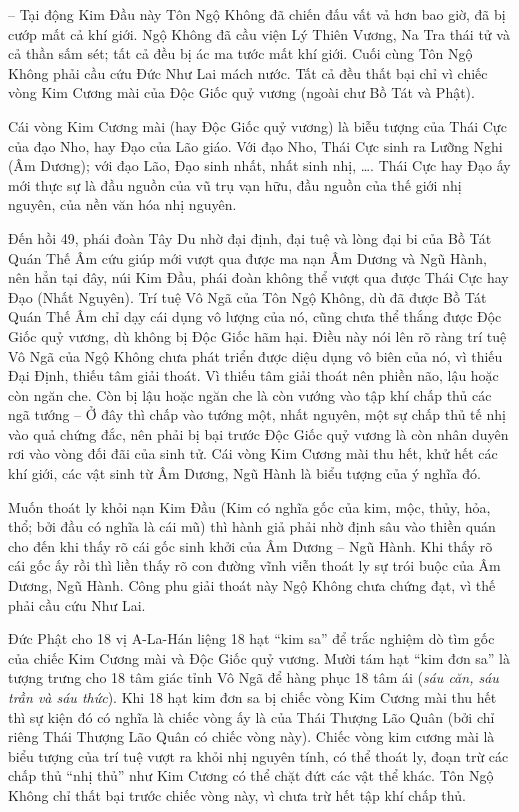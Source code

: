 -- Tại động Kim Đầu này Tôn Ngộ Không đã chiến đấu vất vả hơn bao giờ, đã bị cướp mất cả khí giới. Ngộ Không đã cầu viện Lý Thiên Vương, Na Tra thái tử và cả thần sấm sét; tất cả đều bị ác ma tước mất khí giới. Cuối cùng Tôn Ngộ Không phải cầu cứu Đức Như Lai mách nước. Tất cả đều thất bại chỉ vì chiếc vòng Kim Cương mài của Độc Giốc quỷ vương (ngoài chư Bồ Tát và Phật).

Cái vòng Kim Cương mài (hay Độc Giốc quỷ vương) là biễu tượng của Thái Cực của đạo Nho, hay Đạo của Lão giáo. Với đạo Nho, Thái Cực sinh ra Lưỡng Nghi (Âm Dương); với đạo Lão, Đạo sinh nhất, nhất sinh nhị, \ldots. Thái Cực hay Đạo ấy mới thực sự là đầu nguồn của vũ trụ vạn hữu, đầu nguồn của thế giới nhị nguyên, của nền văn hóa nhị nguyên.

Đến hồi 49, phái đoàn Tây Du nhờ đại định, đại tuệ và lòng đại bi của Bồ Tát Quán Thế Âm cứu giúp mới vượt qua được ma nạn Âm Dương và Ngũ Hành, nên hẳn tại đây, núi Kim Đầu, phái đoàn không thể vượt qua được Thái Cực hay Đạo (Nhất Nguyên). Trí tuệ Vô Ngã của Tôn Ngộ Không, dù đã được Bồ Tát Quán Thế Âm chỉ dạy cái dụng vô lượng của nó, cũng chưa thể thắng được Độc Giốc quỷ vương, dù không bị Độc Giốc hãm hại. Điều này nói lên rõ ràng trí tuệ Vô Ngã của Ngộ Không chưa phát triển được diệu dụng vô biên của nó, vì thiếu Đại Định, thiếu tâm giải thoát. Vì thiếu tâm giải thoát nên phiền não, lậu hoặc còn ngăn che. Còn bị lậu hoặc ngăn che là còn vướng vào tập khí chấp thủ các ngã tướng -- Ở đây thì chấp vào tướng một, nhất nguyên, một sự chấp thủ tế nhị vào quả chứng đắc, nên phải bị bại trước Độc Giốc quỷ vương là còn nhân duyên rơi vào vòng đối đãi của sinh tử. Cái vòng Kim Cương mài thu hết, khử hết các khí giới, các vật sinh từ Âm Dương, Ngũ Hành là biểu tượng của ý nghĩa đó.

Muốn thoát ly khỏi nạn Kim Đầu (Kim có nghĩa gốc của kim, mộc, thủy, hỏa, thổ; bởi đầu có nghĩa là cái mũ) thì hành giả phải nhờ định sâu vào thiền quán cho đến khi thấy rõ cái gốc sinh khởi của Âm Dương -- Ngũ Hành. Khi thấy rõ cái gốc ấy rồi thì liền thấy rõ con đường vĩnh viễn thoát ly sự trói buộc của Âm Dương, Ngũ Hành. Công phu giải thoát này Ngộ Không chưa chứng đạt, vì thế phải cầu cứu Như Lai.

Đức Phật cho 18 vị A-La-Hán liệng 18 hạt ``kim sa'' để trắc nghiệm dò tìm gốc của chiếc Kim Cương mài và Độc Giốc quỷ vương. Mười tám hạt ``kim đơn sa'' là tượng trưng cho 18 tâm giác tỉnh Vô Ngã để hàng phục 18 tâm ái (\emph{sáu căn, sáu trần và sáu thức}). Khi 18 hạt kim đơn sa bị chiếc vòng Kim Cương mài thu hết thì sự kiện đó có nghĩa là chiếc vòng ấy là của Thái Thượng Lão Quân (bởi chỉ riêng Thái Thượng Lão Quân có chiếc vòng này). Chiếc vòng kim cương mài là biểu tượng của trí tuệ vượt ra khỏi nhị nguyên tính, có thể thoát ly, đoạn trừ các chấp thủ ``nhị thủ'' như Kim Cương có thể chặt đứt các vật thể khác. Tôn Ngộ Không chỉ thất bại trước chiếc vòng này, vì chưa trừ hết tập khí chấp thủ.

